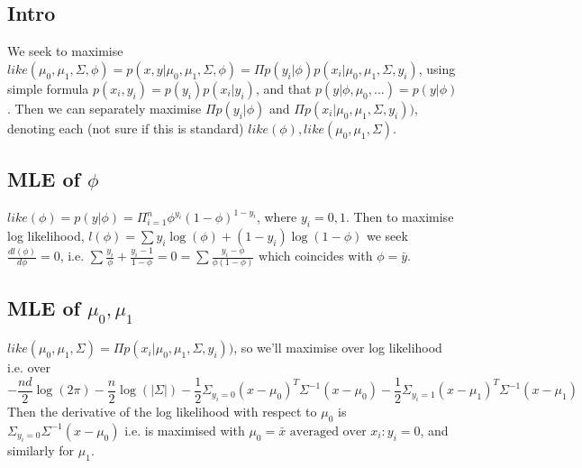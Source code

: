 %
%
\begin{answer}
	
\subsection*{Intro}	
We seek to maximise $like(\mu_0, \mu_1, \Sigma, \phi) = p(x, y | \mu_0, \mu_1, \Sigma, \phi) = \Pi p(y_i | \phi) p(x_i | \mu_0, \mu_1, \Sigma, y_i)$, using simple formula $p(x_i, y_i) = p(y_i)p(x_i | y_i)$, and that  $p(y|\phi, \mu_0, ...) = p(y | \phi)$. Then we can separately maximise $\Pi p(y_i | \phi)$ and $\Pi p(x_i | \mu_0, \mu_1, \Sigma, y_i))$, denoting each (not sure if this is standard) $like(\phi), like(\mu_0, \mu_1, \Sigma)$.

\subsection*{MLE of $\phi$}
$like(\phi) = p(y | \phi) = \Pi_{i=1}^n \phi^{y_i} (1-\phi)^{1- y_i}$, where $y_i = 0,1$. Then to maximise log likelihood, $l(\phi) = \sum y_i \log(\phi) + (1 - y_i) \log(1 - \phi)$ we seek $\frac{d l(\phi)}{d \phi} = 0$, i.e. $ \sum \frac{y_i}{\phi} + \frac{y_i - 1}{1 - \phi} = 0 = \sum \frac{y_i - \phi}{\phi (1- \phi)}$ which coincides with $\phi = \bar{y}$.

\subsection*{MLE of $\mu_0, \mu_1$}
$like(\mu_0, \mu_1, \Sigma) = \Pi p(x_i | \mu_0, \mu_1, \Sigma, y_i))$, so we'll maximise over log likelihood i.e. over 
\begin{equation*} -\frac{nd}{2} \log(2\pi) - \frac{n}{2}\log(|\Sigma|) -\frac{1}{2} \Sigma_{y_i = 0} (x - \mu_0)^T \Sigma^{-1} (x - \mu_0) -\frac{1}{2} \Sigma_{y_i = 1} (x - \mu_1)^T \Sigma^{-1} (x - \mu_1)
\end{equation*}
Then the derivative of the log likelihood with respect to $\mu_0$ is $\Sigma_{y_i = 0} \Sigma^{-1}(x - \mu_0)$ i.e. is maximised with $\mu_0 = \bar x \text{ averaged over } x_i : y_i = 0$, and similarly for $\mu_1$. 


\end{answer}
